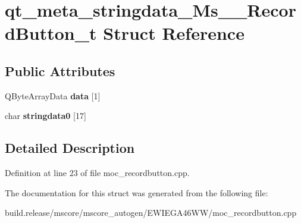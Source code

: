 \hypertarget{structqt__meta__stringdata___ms_____record_button__t}{}\section{qt\+\_\+meta\+\_\+stringdata\+\_\+\+Ms\+\_\+\+\_\+\+Record\+Button\+\_\+t Struct Reference}
\label{structqt__meta__stringdata___ms_____record_button__t}
\subsection*{Public Attributes}
\begin{DoxyCompactItemize}
\item 
\mbox{\label{structqt__meta__stringdata___ms_____record_button__t_a91752a418d24d5ade6f302e5813ad42b}} 
Q\+Byte\+Array\+Data {\bfseries data} \mbox{[}1\mbox{]}
\item 
\mbox{\label{structqt__meta__stringdata___ms_____record_button__t_a44ae25e6748c72c2f1a57a54190c9148}} 
char {\bfseries stringdata0} \mbox{[}17\mbox{]}
\end{DoxyCompactItemize}


\subsection{Detailed Description}


Definition at line 23 of file moc\+\_\+recordbutton.\+cpp.



The documentation for this struct was generated from the following file\+:\begin{DoxyCompactItemize}
\item 
build.\+release/mscore/mscore\+\_\+autogen/\+E\+W\+I\+E\+G\+A46\+W\+W/moc\+\_\+recordbutton.\+cpp\end{DoxyCompactItemize}
